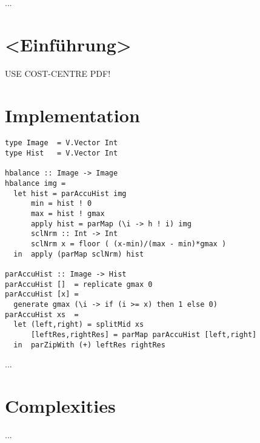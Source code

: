 

...

\section{<Einführung>}
  USE COST-CENTRE PDF!

\section{Implementation}

  \begin{lstlisting}
type Image  = V.Vector Int
type Hist   = V.Vector Int

hbalance :: Image -> Image
hbalance img =
  let hist = parAccuHist img
      min = hist ! 0
      max = hist ! gmax
      apply hist = parMap (\i -> h ! i) img
      sclNrm :: Int -> Int
      sclNrm x = floor ( (x-min)/(max - min)*gmax )
  in  apply (parMap sclNrm) hist

parAccuHist :: Image -> Hist
parAccuHist []  = replicate gmax 0
parAccuHist [x] =
  generate gmax (\i -> if (i >= x) then 1 else 0)
parAccuHist xs  =
  let (left,right) = splitMid xs
      [leftRes,rightRes] = parMap parAccuHist [left,right]
  in  parZipWith (+) leftRes rightRes
  \end{lstlisting}
  ...
    
\section{Complexities}
  ...
